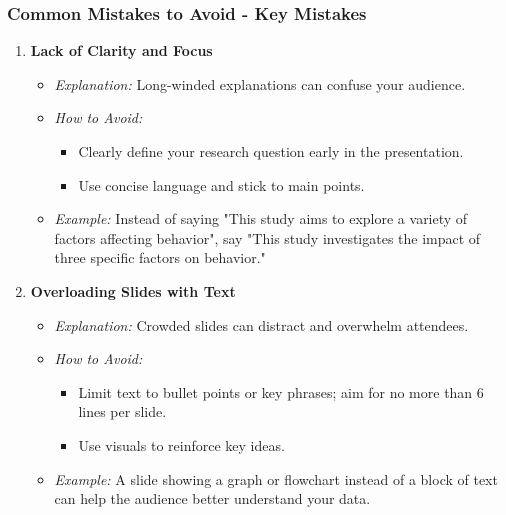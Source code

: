 \documentclass[aspectratio=169]{beamer}
\begin{document}
\begin{frame}[fragile]
  \frametitle{Common Mistakes to Avoid - Key Mistakes}
  \begin{enumerate}
    \item \textbf{Lack of Clarity and Focus}
      \begin{itemize}
        \item \textit{Explanation:} Long-winded explanations can confuse your audience.
        \item \textit{How to Avoid:}
        \begin{itemize}
          \item Clearly define your research question early in the presentation.
          \item Use concise language and stick to main points.
        \end{itemize}
        \item \textit{Example:} Instead of saying "This study aims to explore a variety of factors affecting behavior", say "This study investigates the impact of three specific factors on behavior."
      \end{itemize}
      
    \item \textbf{Overloading Slides with Text}
      \begin{itemize}
        \item \textit{Explanation:} Crowded slides can distract and overwhelm attendees.
        \item \textit{How to Avoid:}
        \begin{itemize}
          \item Limit text to bullet points or key phrases; aim for no more than 6 lines per slide.
          \item Use visuals to reinforce key ideas.
        \end{itemize}
        \item \textit{Example:} A slide showing a graph or flowchart instead of a block of text can help the audience better understand your data.
      \end{itemize}
  \end{enumerate}
\end{frame}
\end{document}
